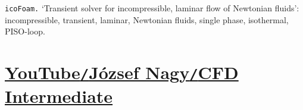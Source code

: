 \documentclass[oneside]{book}
\numberwithin{equation}{section}
\begin{document}
\texttt{icoFoam.} `Transient solver for incompressible, laminar flow of Newtonian fluids': incompressible, transient, laminar, Newtonian fluids, single phase, isothermal, PISO-loop.



\section{\href{https://www.youtube.com/playlist?list=PLcOe4WUSsMkGPdwCpZfKcpn7w-EkgAMB8}{YouTube\texttt{/}J\'ozsef Nagy\texttt{/}CFD Intermediate}}




\printbibliography[heading=bibintoc]
	
\end{document}
